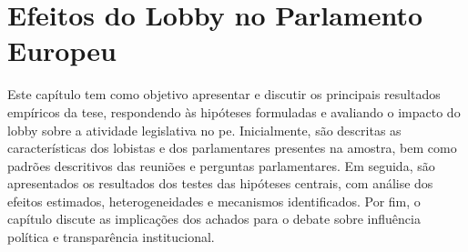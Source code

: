 \chapter{Efeitos do Lobby no Parlamento Europeu}
\label{chapter:resultados}
Este capítulo tem como objetivo apresentar e discutir os principais resultados empíricos da tese, respondendo às hipóteses formuladas e avaliando o impacto do lobby sobre a atividade legislativa no \acrshort{pe}. Inicialmente, são descritas as características dos lobistas e dos parlamentares presentes na amostra, bem como padrões descritivos das reuniões e perguntas parlamentares. Em seguida, são apresentados os resultados dos testes das hipóteses centrais, com análise dos efeitos estimados, heterogeneidades e mecanismos identificados. Por fim, o capítulo discute as implicações dos achados para o debate sobre influência política e transparência institucional.





